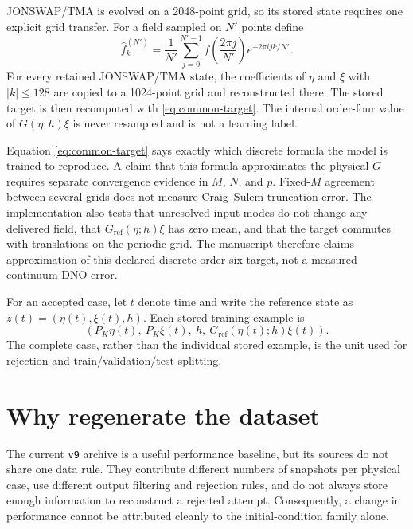 \documentclass[11pt]{article}
\begin{document}
JONSWAP/TMA is evolved on a 2048-point grid, so its stored state requires one
explicit grid transfer.  For a field sampled on \(N'\) points define
\begin{equation}
  \widehat f_k^{(N')}
  =\frac1{N'}\sum_{j=0}^{N'-1}
    f\!\left(\frac{2\pi j}{N'}\right)e^{-2\pi i jk/N'}.
  \label{eq:normalized-fourier-transfer}
\end{equation}
For every retained JONSWAP/TMA state, the coefficients of \(\eta\) and \(\xi\)
with \(|k|\le128\) are copied to a 1024-point grid and reconstructed there.
The stored target is then recomputed with \eqref{eq:common-target}.  The
internal order-four value of \(G(\eta;h)\xi\) is never resampled and is not a
learning label.

Equation \eqref{eq:common-target} says exactly which discrete formula the model is
trained to reproduce.  A claim that this formula approximates the physical $G$
requires separate convergence evidence in $M$, $N$, and $p$.  Fixed-$M$
agreement between several grids does not measure Craig--Sulem truncation
error.  The implementation also tests that unresolved input modes do not
change any delivered field, that $G_{\mathrm{ref}}(\eta;h)\xi$ has zero
mean, and that
the target commutes with translations on the periodic grid.  The manuscript
therefore claims approximation of this declared discrete order-six target,
not a measured continuum-DNO error.

For an accepted case, let $t$ denote time and write the reference state as
$z(t)=(\eta(t),\xi(t),h)$.  Each stored training
example is
\begin{equation}
  \left(
    P_K\eta(t),\ P_K\xi(t),\ h,\
    G_{\mathrm{ref}}(\eta(t);h)\xi(t)
  \right).
  \label{eq:stored-training-example}
\end{equation}
The complete case, rather than the individual stored example, is the unit
used for rejection and train/validation/test splitting.

\section{Why regenerate the dataset}

The current \texttt{v9} archive is a useful performance baseline, but its
sources do not share one data rule.  They contribute different numbers of
snapshots per physical case, use different output filtering and rejection
rules, and do not always store enough information to reconstruct a rejected
attempt.  Consequently, a change in performance cannot be attributed cleanly
to the initial-condition family alone.
\end{document}
